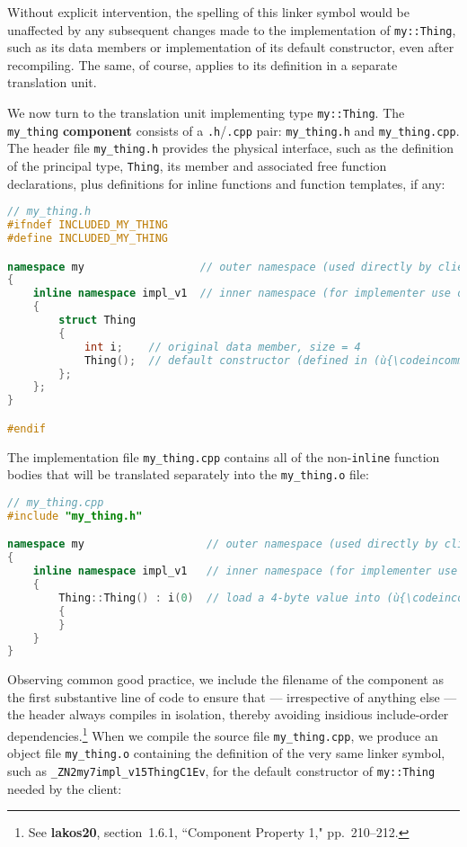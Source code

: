 \noindent Without explicit intervention, the spelling of this linker symbol would
be unaffected by any subsequent changes made to the implementation of
\texttt{my::Thing}, such as its data members or implementation of its
default constructor, even after recompiling. The same, of course,
applies to its definition in a separate translation unit.

We now turn to the translation unit implementing type
\texttt{my::Thing}. The \texttt{my\_thing} \textbf{component} consists
of a \texttt{.h}/\texttt{.cpp} pair: \texttt{my\_thing.h} and
\texttt{my\_thing.cpp}. The header file \texttt{my\_thing.h} provides
the physical interface, such as the definition of the principal type,
\texttt{Thing}, its member and associated free function declarations,
plus definitions for inline functions and function templates, if any:

\begin{lstlisting}[language=C++]
// my_thing.h
#ifndef INCLUDED_MY_THING
#define INCLUDED_MY_THING

namespace my                  // outer namespace (used directly by clients)
{
    inline namespace impl_v1  // inner namespace (for implementer use only)
    {
        struct Thing
        {
            int i;    // original data member, size = 4
            Thing();  // default constructor (defined in (ù{\codeincomments{my\_thing.cpp}}ù))
        };
    };
}

#endif
\end{lstlisting}
    
\noindent The implementation file \texttt{my\_thing.cpp} contains all of the
non-\texttt{inline} function bodies that will be translated separately
into the \texttt{my\_thing.o} file:

\begin{lstlisting}[language=C++]
// my_thing.cpp
#include "my_thing.h"

namespace my                   // outer namespace (used directly by clients)
{
    inline namespace impl_v1   // inner namespace (for implementer use only)
    {
        Thing::Thing() : i(0)  // load a 4-byte value into (ù{\codeincomments{Thing}}ù)'s data member
        {
        }
    }
}
\end{lstlisting}
    
\noindent Observing common good practice, we include the filename of the component
as the first substantive line of code to ensure that --- irrespective of
anything else --- the header always compiles in isolation, thereby
avoiding insidious include-order dependencies.{\cprotect\footnote{See
  \textbf{{lakos20}}, section~1.6.1, ``Component Property 1," pp.~210--212.}} When we compile the source file \texttt{my\_thing.cpp},
we produce an object file \texttt{my\_thing.o} containing the definition
of the very same linker symbol, such as
\texttt{\_ZN2my7impl\_v15ThingC1Ev}, for the default constructor of
\texttt{my::Thing} needed by the client:

